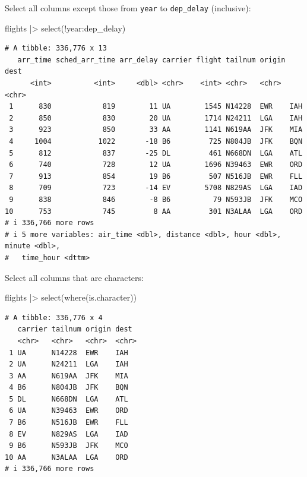 \documentclass[
  letterpaper,
  DIV=11,
  numbers=noendperiod]{scrreprt}
\newenvironment{Shaded}{\begin{snugshade}}{\end{snugshade}}
\newcommand{\FunctionTok}[1]{\textcolor[rgb]{0.28,0.35,0.67}{#1}}
\newcommand{\NormalTok}[1]{\textcolor[rgb]{0.00,0.23,0.31}{#1}}
\newcommand{\SpecialCharTok}[1]{\textcolor[rgb]{0.37,0.37,0.37}{#1}}
\begin{document}
Select all columns except those from \texttt{year} to
\texttt{dep\_delay} (inclusive):

\begin{Shaded}
\begin{Highlighting}[]
\NormalTok{flights }\SpecialCharTok{|\textgreater{}}
  \FunctionTok{select}\NormalTok{(}\SpecialCharTok{!}\NormalTok{year}\SpecialCharTok{:}\NormalTok{dep\_delay)}
\end{Highlighting}
\end{Shaded}

\begin{verbatim}
# A tibble: 336,776 x 13
   arr_time sched_arr_time arr_delay carrier flight tailnum origin dest 
      <int>          <int>     <dbl> <chr>    <int> <chr>   <chr>  <chr>
 1      830            819        11 UA        1545 N14228  EWR    IAH  
 2      850            830        20 UA        1714 N24211  LGA    IAH  
 3      923            850        33 AA        1141 N619AA  JFK    MIA  
 4     1004           1022       -18 B6         725 N804JB  JFK    BQN  
 5      812            837       -25 DL         461 N668DN  LGA    ATL  
 6      740            728        12 UA        1696 N39463  EWR    ORD  
 7      913            854        19 B6         507 N516JB  EWR    FLL  
 8      709            723       -14 EV        5708 N829AS  LGA    IAD  
 9      838            846        -8 B6          79 N593JB  JFK    MCO  
10      753            745         8 AA         301 N3ALAA  LGA    ORD  
# i 336,766 more rows
# i 5 more variables: air_time <dbl>, distance <dbl>, hour <dbl>, minute <dbl>,
#   time_hour <dttm>
\end{verbatim}

Select all columns that are characters:

\begin{Shaded}
\begin{Highlighting}[]
\NormalTok{flights }\SpecialCharTok{|\textgreater{}}
  \FunctionTok{select}\NormalTok{(}\FunctionTok{where}\NormalTok{(is.character))}
\end{Highlighting}
\end{Shaded}

\begin{verbatim}
# A tibble: 336,776 x 4
   carrier tailnum origin dest 
   <chr>   <chr>   <chr>  <chr>
 1 UA      N14228  EWR    IAH  
 2 UA      N24211  LGA    IAH  
 3 AA      N619AA  JFK    MIA  
 4 B6      N804JB  JFK    BQN  
 5 DL      N668DN  LGA    ATL  
 6 UA      N39463  EWR    ORD  
 7 B6      N516JB  EWR    FLL  
 8 EV      N829AS  LGA    IAD  
 9 B6      N593JB  JFK    MCO  
10 AA      N3ALAA  LGA    ORD  
# i 336,766 more rows
\end{verbatim}
\end{document}
